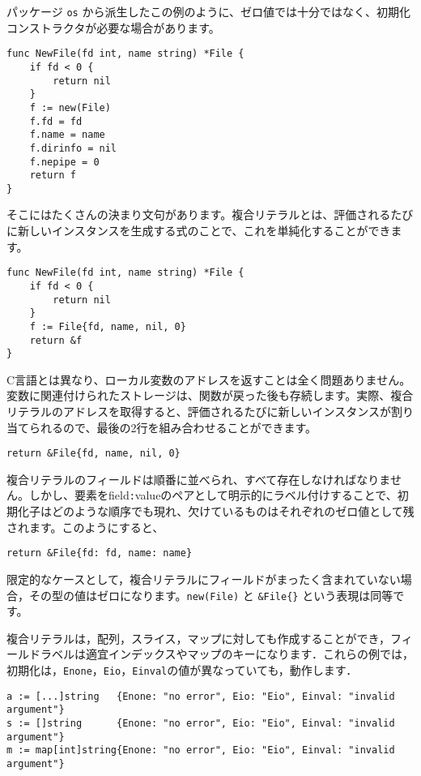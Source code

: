 \documentclass{jsarticle}
\begin{document}
パッケージ \texttt{os}
から派生したこの例のように、ゼロ値では十分ではなく、初期化コンストラクタが必要な場合があります。

\begin{lstlisting}[numbers=none]
func NewFile(fd int, name string) *File {
    if fd < 0 {
        return nil
    }
    f := new(File)
    f.fd = fd
    f.name = name
    f.dirinfo = nil
    f.nepipe = 0
    return f
}
\end{lstlisting}

そこにはたくさんの決まり文句があります。複合リテラルとは、評価されるたびに新しいインスタンスを生成する式のことで、これを単純化することができます。

\begin{lstlisting}[numbers=none]
func NewFile(fd int, name string) *File {
    if fd < 0 {
        return nil
    }
    f := File{fd, name, nil, 0}
    return &f
}
\end{lstlisting}

C言語とは異なり、ローカル変数のアドレスを返すことは全く問題ありません。変数に関連付けられたストレージは、関数が戻った後も存続します。実際、複合リテラルのアドレスを取得すると、評価されるたびに新しいインスタンスが割り当てられるので、最後の2行を組み合わせることができます。

\begin{lstlisting}[numbers=none]
    return &File{fd, name, nil, 0}
\end{lstlisting}

複合リテラルのフィールドは順番に並べられ、すべて存在しなければなりません。しかし、要素をfield\texttt{:}valueのペアとして明示的にラベル付けすることで、初期化子はどのような順序でも現れ、欠けているものはそれぞれのゼロ値として残されます。このようにすると、

\begin{lstlisting}[numbers=none]
    return &File{fd: fd, name: name}
\end{lstlisting}

限定的なケースとして，複合リテラルにフィールドがまったく含まれていない場合，その型の値はゼロになります。\texttt{new(File)}
と \texttt{\&File\{\}} という表現は同等です。

複合リテラルは，配列，スライス，マップに対しても作成することができ，フィールドラベルは適宜インデックスやマップのキーになります．これらの例では，初期化は，\texttt{Enone}，\texttt{Eio}，\texttt{Einval}の値が異なっていても，動作します．

\begin{lstlisting}[numbers=none]
a := [...]string   {Enone: "no error", Eio: "Eio", Einval: "invalid argument"}
s := []string      {Enone: "no error", Eio: "Eio", Einval: "invalid argument"}
m := map[int]string{Enone: "no error", Eio: "Eio", Einval: "invalid argument"}
\end{lstlisting}
\end{document}

